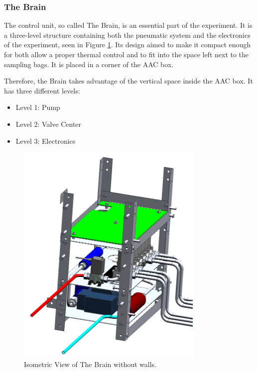 \pagebreak
\subsubsection{The Brain}

The control unit, so called The Brain, is an essential part of the experiment. It is a three-level structure containing both the pneumatic system and the electronics of the experiment, seen in Figure \ref{brain_isometric_open}. Its design aimed to make it compact enough for both allow a proper thermal control and to fit into the space left next to the sampling bags. It is placed in a corner of the AAC box. 

Therefore, the Brain takes advantage of the vertical space inside the AAC box. It has three different levels: 

\begin{itemize}
    \item Level 1: Pump
    \item Level 2: Valve Center
    \item Level 3: Electronics
\end{itemize}


\begin{figure}[H]
    \centering
    \includegraphics[width=0.8\textwidth]{4-experiment-design/img/Mechanical/Brain_Isometric_Open.png}
    \caption{Isometric View of The Brain without walls.}
    \label{brain_isometric_open}
\end{figure}

